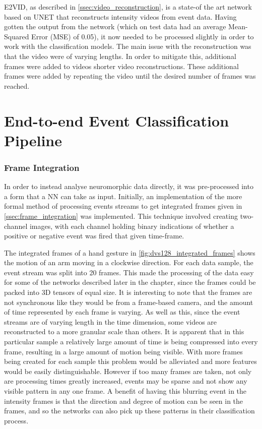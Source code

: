 E2VID, as described in \cref{ssec:video_reconstruction}, is a state-of the art network based on UNET that reconstructs intensity videos from event data. Having gotten the output from the network (which on test data had an average Mean-Squared Error (MSE) of 0.05), it now needed to be processed slightly in order to work with the classification models. The main issue with the reconstruction was that the video were of varying lengths. In order to mitigate this, additional frames were added to videos shorter video reconstructions. These additional frames were added by repeating the video until the desired number of frames was reached.

\section{End-to-end Event Classification Pipeline}

\subsubsection{Frame Integration}

In order to instead analyse neuromorphic data directly, it was pre-processed into a form that a NN can take as input. Initially, an implementation of the more formal method of processing events streams to get integrated frames given in \cref{ssec:frame_integration} was implemented. This technique involved creating two-channel images, with each channel holding binary indications of whether a positive or negative event was fired that given time-frame.

The integrated frames of a hand gesture in \cref{fig:dvs128_integrated_frames} shows the motion of an arm moving in a clockwise direction. For each data sample, the event stream was split into 20 frames. This made the processing of the data easy for some of the networks described later in the chapter, since the frames could be packed into 3D tensors of equal size. It is interesting to note that the frames are not synchronous like they would be from a frame-based camera, and the amount of time represented by each frame is varying. As well as this, since the event streams are of varying length in the time dimension, some videos are reconstructed to a more granular scale than others. It is apparent that in this particular sample a relatively large amount of time is being compressed into every frame, resulting in a large amount of motion being visible. With more frames being created for each sample this problem would be alleviated and more features would be easily distinguishable. However if too many frames are taken, not only are processing times greatly increased, events may be sparse and not show any visible pattern in any one frame. A benefit of having this blurring event in the intensity frames is that the direction and degree of motion can be seen in the frames, and so the networks can also pick up these patterns in their classification process.


